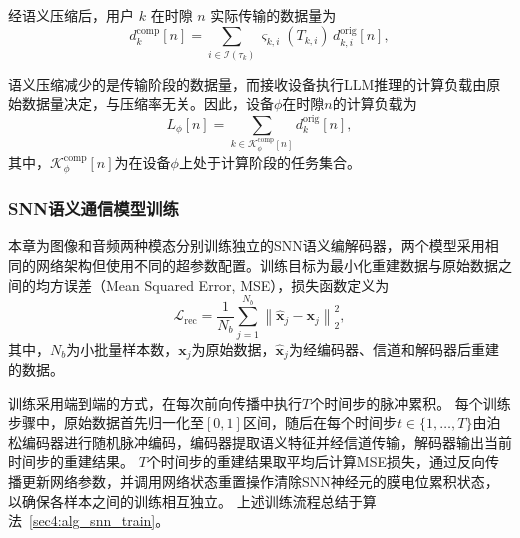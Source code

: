 经语义压缩后，用户 $k$ 在时隙 $n$ 实际传输的数据量为
\begin{equation}\label{eq:d_comp}
d_{k}^{\text{comp}}[n] = \sum_{i\in\mathcal{I}(\tau_k)}\varsigma_{k,i}(T_{k,i})\, d_{k,i}^{\text{orig}}[n],
\end{equation}

语义压缩减少的是传输阶段的数据量，而接收设备执行LLM推理的计算负载由原始数据量决定，与压缩率无关。因此，设备$\phi$在时隙$n$的计算负载为
\begin{equation}
L_{\phi}[n] = \sum_{k \in \mathcal{K}_\phi^{\text{comp}}[n]} d_{k}^{\text{orig}}[n],
\end{equation}
其中，$\mathcal{K}_\phi^{\text{comp}}[n]$为在设备$\phi$上处于计算阶段的任务集合。


\subsubsection{SNN语义通信模型训练}
本章为图像和音频两种模态分别训练独立的SNN语义编解码器，两个模型采用相同的网络架构但使用不同的超参数配置。训练目标为最小化重建数据与原始数据之间的均方误差（Mean Squared Error, MSE），损失函数定义为
\begin{equation}
\mathcal{L}_{\text{rec}} = \frac{1}{N_b}\sum_{j=1}^{N_b}\left\|\hat{\mathbf{x}}_j - \mathbf{x}_j\right\|_2^2,
\end{equation}
其中，$N_b$为小批量样本数，$\mathbf{x}_j$为原始数据，$\hat{\mathbf{x}}_j$为经编码器、信道和解码器后重建的数据。

训练采用端到端的方式，在每次前向传播中执行$T$个时间步的脉冲累积。
每个训练步骤中，原始数据首先归一化至$[0,1]$区间，随后在每个时间步$t\in\{1,\ldots,T\}$由泊松编码器进行随机脉冲编码，编码器提取语义特征并经信道传输，解码器输出当前时间步的重建结果。
$T$个时间步的重建结果取平均后计算MSE损失，通过反向传播更新网络参数，并调用网络状态重置操作清除SNN神经元的膜电位累积状态，以确保各样本之间的训练相互独立。
上述训练流程总结于算法~\ref{sec4:alg_snn_train}。


